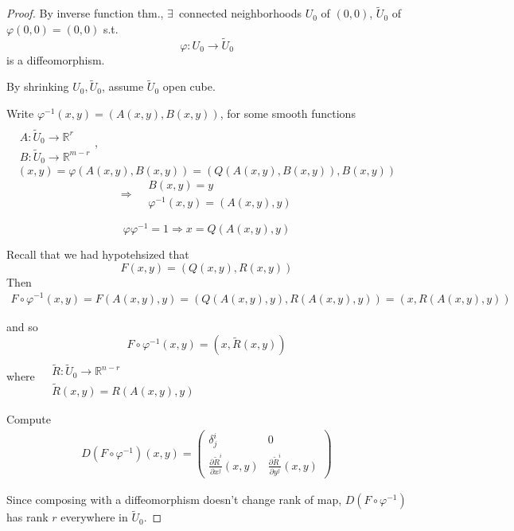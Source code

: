 \documentclass[10pt]{amsart}
\begin{document}
\begin{multicols*}{2}
\begin{proof}
	By inverse function thm., $\exists \, $ connected neighborhoods $U_0$ of $(0,0)$, $\widetilde{U}_0$ of $\varphi(0,0) = (0,0)$ s.t. 
	\[
	\varphi : U_0 \to \widetilde{U}_0
	\]
	is a diffeomorphism.
	
	By shrinking $U_0, \widetilde{U}_0$, assume $\widetilde{U}_0$ open cube.
	
	Write $\varphi^{-1}(x,y) = (A(x,y), B(x,y))$, for some smooth functions $\begin{aligned} & \quad \\ 
	& A:\widetilde{U}_0 \to \mathbb{R}^r \\ 
	& B: \widetilde{U}_0 \to \mathbb{R}^{m-r}\end{aligned}$,
	\[
	(x,y) = \varphi(A(x,y) , B(x,y)) = (Q(A(x,y), B(x,y)), B(x,y))
	\]
	\[
	\Longrightarrow \begin{aligned} & B(x,y) = y \\ 
	& \varphi^{-1}(x,y) = (A(x,y), y) \end{aligned}  
	\]
	
	\[
	\varphi \varphi^{-1} = 1 \Longrightarrow x = Q(A(x,y), y)
	\]
	
	Recall that we had hypotehsized that 
	\[
	F(x,y) = (Q(x,y) , R(x,y))
	\]
	Then
	\[
	\begin{gathered}
		F \circ \varphi^{-1}(x,y) = F(A(x,y), y) = (Q(A(x,y), y), R(A(x,y), y)) = (x, R(A(x,y), y))
	\end{gathered}
	\]

	and so 
	\[
	F\circ \varphi^{-1}(x,y) = (x, \widetilde{R}(x,y))
	\]
	where $\begin{aligned} & \quad \\ 
	& \widetilde{R} : \widetilde{U}_0 \to \mathbb{R}^{n-r} \\
	& \widetilde{R}(x,y) = R(A(x,y), y)
	\end{aligned}$

	Compute
	\[
	\begin{gathered}
		D(F\circ \varphi^{-1})(x,y) = \left( \begin{matrix} \delta^i_j & 0 \\
		\frac{ \partial \widetilde{R}^i }{ \partial x^j}(x,y) & \frac{ \partial \widetilde{R}^i }{ \partial y^j}(x,y) \end{matrix} \right) 	
	\end{gathered}
	\]
	
	Since composing with a diffeomorphism doesn't change rank of map, $D(F\circ \varphi^{-1})$ has rank $r$ everywhere in $\widetilde{U}_0$.  


\end{proof}
\end{multicols*}
\end{document}
